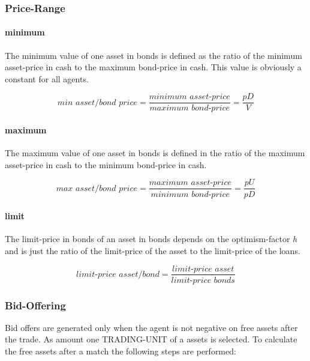 \documentclass[Bachelorarbeit.tex]{subfiles}
\begin{document}
\subsubsection{Price-Range}

\paragraph{minimum}
The minimum value of one asset in bonds is defined as the ratio of the minimum asset-price in cash to the maximum bond-price in cash. This value is obviously a constant for all agents.

\begin{equation}
\textit{min asset/bond price} = \frac{\textit{minimum asset-price}}{\textit{maximum bond-price}} = \frac{pD}{V}
\end{equation}
 
\paragraph{maximum}
The maximum value of one asset in bonds is defined in the ratio of the maximum asset-price in cash to the minimum bond-price in cash.

\begin{equation}
\textit{max asset/bond price} = \frac{\textit{maximum asset-price}}{\textit{minimum bond-price}} = \frac{pU}{pD}
\end{equation}

\paragraph{limit}
The limit-price in bonds of an asset in bonds depends on the optimism-factor \textit{h} and is just the ratio of the limit-price of the asset to the limit-price of the loans.

\begin{equation}
\textit{limit-price asset/bond} = \frac{\textit{limit-price asset}}{\textit{limit-price bonds}}
\end{equation}

\subsubsection{Bid-Offering}
Bid offers are generated only when the agent is not negative on free assets after the trade. As amount one TRADING-UNIT of a assets is selected. To calculate the free assets after a match the following steps are performed:
\end{document}
